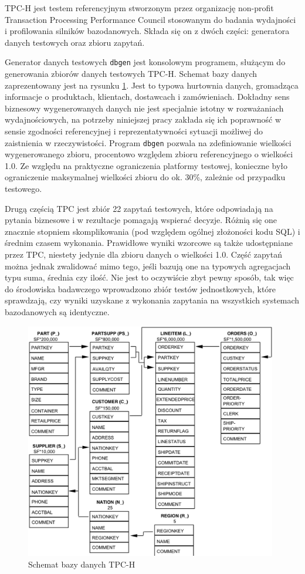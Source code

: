 \documentclass[12pt]{extarticle}
\begin{document}
    TPC-H jest testem referencyjnym stworzonym przez organizację non-profit Transaction Processing Performance Council stosowanym do badania wydajności i profilowania silników bazodanowych. Składa się on z dwóch części: generatora danych testowych oraz zbioru zapytań.

    Generator danych testowych \texttt{dbgen} jest konsolowym programem, służącym do generowania zbiorów danych testowych TPC-H. Schemat bazy danych zaprezentowany jest na rysunku \ref{fig:tpcschema}. Jest to typowa hurtownia danych, gromadząca informacje o produktach, klientach, dostawcach i zamówieniach. Dokładny sens biznesowy wygenerowanych danych nie jest specjalnie istotny w rozważaniach wydajnościowych, na potrzeby niniejszej pracy zakłada się ich poprawność w sensie zgodności referencyjnej i reprezentatywności sytuacji możliwej do zaistnienia w rzeczywistości. Program \texttt{dbgen} pozwala na zdefiniowanie wielkości wygenerowanego zbioru, procentowo względem zbioru referencyjnego o wielkości 1.0. Ze względu na praktyczne ograniczenia platformy testowej, konieczne było ograniczenie maksymalnej wielkości zbioru do ok. 30\%, zależnie od przypadku testowego. 

    Drugą częścią TPC jest zbiór 22 zapytań testowych, które odpowiadają na pytania biznesowe i w rezultacje pomagają wspierać decyzje. Różnią się one znacznie stopniem skomplikowania (pod względem ogólnej złożoności kodu SQL) i średnim czasem wykonania. Prawidłowe wyniki wzorcowe są także udostępniane przez TPC, niestety jedynie dla zbioru danych o wielkości 1.0. Część zapytań można jednak zwalidować mimo tego, jeśli bazują one na typowych agregacjach typu suma, średnia czy ilość. Nie jest to oczywiście zbyt pewny sposób, tak więc do środowiska badawczego wprowadzono zbiór testów jednostkowych, które sprawdzają, czy wyniki uzyskane z wykonania zapytania na wszystkich systemach bazodanowych są identyczne.


\begin{figure}
\centering
\includegraphics[width=11cm]{tpc-schema.png}
\caption{Schemat bazy danych TPC-H}
\label{fig:tpcschema}
\end{figure}
\end{document}
